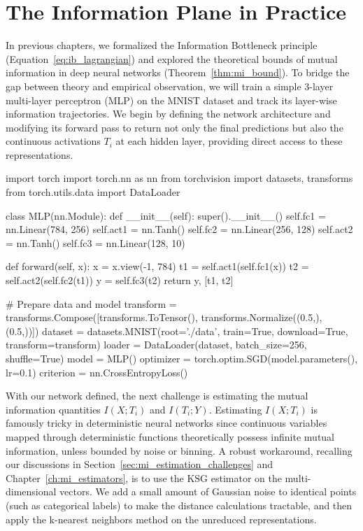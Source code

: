 \chapter{The Information Plane in Practice}
\label{chap:info_plane_practice}

In previous chapters, we formalized the Information Bottleneck principle (Equation~\ref{eq:ib_lagrangian}) and explored the theoretical bounds of mutual information in deep neural networks (Theorem~\ref{thm:mi_bound}). To bridge the gap between theory and empirical observation, we will train a simple 3-layer multi-layer perceptron (MLP) on the MNIST dataset and track its layer-wise information trajectories. We begin by defining the network architecture and modifying its forward pass to return not only the final predictions but also the continuous activations $T_i$ at each hidden layer, providing direct access to these representations.

\begin{pycode}
import torch
import torch.nn as nn
from torchvision import datasets, transforms
from torch.utils.data import DataLoader

class MLP(nn.Module):
    def __init__(self):
        super().__init__()
        self.fc1 = nn.Linear(784, 256)
        self.act1 = nn.Tanh()
        self.fc2 = nn.Linear(256, 128)
        self.act2 = nn.Tanh()
        self.fc3 = nn.Linear(128, 10)
        
    def forward(self, x):
        x = x.view(-1, 784)
        t1 = self.act1(self.fc1(x))
        t2 = self.act2(self.fc2(t1))
        y = self.fc3(t2)
        return y, [t1, t2]

# Prepare data and model
transform = transforms.Compose([transforms.ToTensor(), transforms.Normalize((0.5,), (0.5,))])
dataset = datasets.MNIST(root='./data', train=True, download=True, transform=transform)
loader = DataLoader(dataset, batch_size=256, shuffle=True)
model = MLP()
optimizer = torch.optim.SGD(model.parameters(), lr=0.1)
criterion = nn.CrossEntropyLoss()
\end{pycode}

With our network defined, the next challenge is estimating the mutual information quantities $I(X; T_i)$ and $I(T_i; Y)$. Estimating $I(X; T_i)$ is famously tricky in deterministic neural networks since continuous variables mapped through deterministic functions theoretically possess infinite mutual information, unless bounded by noise or binning. A robust workaround, recalling our discussions in Section~\ref{sec:mi_estimation_challenges} and Chapter~\ref{ch:mi_estimators}, is to use the KSG estimator on the multi-dimensional vectors. We add a small amount of Gaussian noise to identical points (such as categorical labels) to make the distance calculations tractable, and then apply the k-nearest neighbors method on the unreduced representations.

